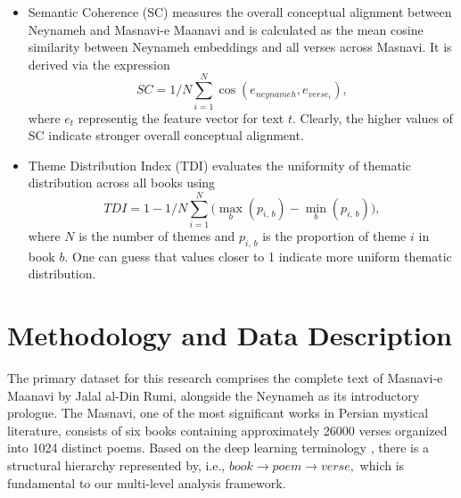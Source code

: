 \documentclass[twoside]{article}
\begin{document}
\begin{itemize}
\item  Semantic Coherence (SC) measures the overall conceptual alignment between Neynameh and Masnavi-e Maanavi and is
calculated as the mean cosine similarity between Neynameh embeddings and all verses across Masnavi. It is derived via the expression
\begin{equation*}
	SC=1/N \sum_{i=1}^N  \cos (e_{neynameh} ,e_{verse_i} ),
\end{equation*}
where $e_t$  representig the feature vector for text $t.$
Clearly,   the higher values  of SC   indicate stronger overall conceptual alignment.

\item  Theme Distribution Index (TDI)  evaluates the uniformity of thematic distribution across all books  using
\begin{equation*}
	TDI=1- 1/N \sum_{i=1}^N  \Big( \max _b (p_{i,\, b}) -\min_b (p_{i,\, b})   \Big),
\end{equation*}
where  $N$  is the number of themes and  $ p_{i, \,b}$  is the proportion of theme $i$   in book   $b.$
One can guess that values closer to  1   indicate more uniform thematic distribution.


\end{itemize}

\section{Methodology and Data Description} \label{sec3}
The primary dataset for this research comprises the complete text of Masnavi-e Maanavi by Jalal al-Din Rumi, alongside the Neynameh as its introductory prologue. The Masnavi, one of the most significant works in Persian mystical literature, consists of six books containing approximately 26000 verses organized into 1024 distinct poems.  Based on the deep learning terminology \citep{Goodfellowetal:2016}, there is a structural hierarchy represented by, i.e.,  
$book \rightarrow poem \rightarrow verse,$ which is fundamental to our multi-level analysis framework.
\end{document}

